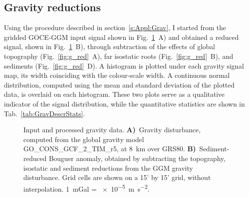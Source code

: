 \subsection{Gravity reductions}
\label{ss:Appl:DiscGravReductions}

Using the procedure described in section~\ref{s:Appl:Grav}, I started from the gridded GOCE-GGM input signal shown in Fig.~\ref{fig:GGMmerged}~A) and obtained a reduced signal, shown in Fig.~\ref{fig:GGMmerged}~B), through subtraction of the effects of global topography (Fig.~\ref{fig:g_red}~A), far isostatic roots (Fig.~\ref{fig:g_red}~B), and sediments (Fig.~\ref{fig:g_red}~D).
A histogram is plotted under each gravity signal map, its width coinciding with the colour-scale width.
A continuous normal distribution, computed using the mean and standard deviation of the plotted data, is overlaid on each histogram.
These two plots serve as a qualitative indicator of the signal distribution, while the quantitative statistics are shown in Tab.~\ref{tab:GravDescrStats}.

\begin{figure}
    \begin{adjustbox}{center}
    \end{adjustbox}
	\caption[Input and processed gravity data.]{Input and processed gravity data.
	\textbf{A)}~Gravity disturbance, computed from the global gravity model {GO\_CONS\_GCF\_2\_TIM\_r5}, at \SI{8}{\kilo \metre} over GRS80.
	\textbf{B)}~Sediment-reduced Bouguer anomaly, obtained by subtracting the topography, isostatic and sediment reductions from the GGM gravity disturbance.
	Grid cells are shown on a 15' by 15' grid, without interpolation. \SI{1}{mGal} = \SI{e-5}{\metre \per \square \second}.}
	\label{fig:GGMmerged}
\end{figure}

